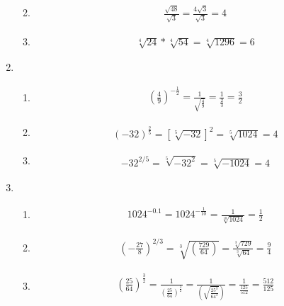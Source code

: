 \documentclass{article}
\begin{document}
\begin{enumerate}
\begin{enumerate}
\begin{align*}
		            \end{align*}
		      \item
		            \begin{align*}
			            \frac{\sqrt{48}}{\sqrt{3}}
			            = \frac{4\sqrt{3}}{\sqrt{3}}
			            = 4
		            \end{align*}
		      \item
		            \begin{align*}
			            \sqrt[4]{24}*\sqrt[4]{54}
			            = \sqrt[4]{1296}
			            = 6
		            \end{align*}
	      \end{enumerate}
	\item
	      \begin{enumerate}
		      \item
		            \begin{align*}
			            \left(\frac{4}{9}\right)^{-\frac{1}{2}}
			            = \frac{1}{\sqrt{\frac{4}{9}}}
			            = \frac{1}{\frac{2}{3}}
			            = \frac{3}{2}
		            \end{align*}
		      \item
		            \begin{align*}
			            (-32)^{\frac{2}{5}}
			            = \left[\sqrt[5]{-32}\right]^2
			            = \sqrt[5]{1024}
			            = 4
		            \end{align*}
		      \item
		            \begin{align*}
			            -32^{2/5}
			            = \sqrt[5]{-32^2}
			            = \sqrt[5]{-1024}
			            = 4
		            \end{align*}
	      \end{enumerate}
	\item
	      \begin{enumerate}
		      \item
		            \begin{align*}
			            1024^{-0.1}  = 1024^{-\frac{1}{10}}
			            = \frac{1}{\sqrt[10]{1024}}
			            = \frac{1}{2}
		            \end{align*}
		      \item
		            \begin{align*}
			            \left(-\frac{27}{8}\right)^{2/3}
			            = \sqrt[3]{\left(\frac{729}{64}\right)}
			            = \frac{\sqrt[3]{729}}{\sqrt[3]{64}}
			            = \frac{9}{4}
		            \end{align*}
		      \item
		            \begin{align*}
			            \left(\frac{25}{64}\right)^{\frac{3}{2}}
			            = \frac{1}{\left(\frac{25}{64}\right)^{\frac{3}{2}}}
			            = \frac{1}{\left(\sqrt{\frac{{25^3}}{64^3}}\right)}
			            = \frac{1}{\frac{125}{512}}
			            = \frac{512}{125}
		            \end{align*}
	      \end{enumerate}
\end{enumerate}
\end{document}
